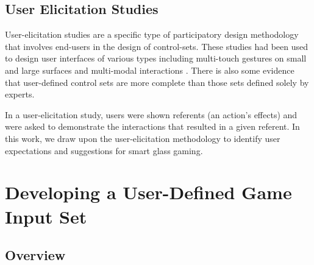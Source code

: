 \documentclass{sigchi}
\begin{document}
    \subsection{User Elicitation Studies}
    User-elicitation studies are a specific type of participatory design methodology that involves end-users in the design of control-sets\cite{Good:1984:BUI:358274.358284,Morris:2012:WWI:2396636.2396651}. These studies had been used to design user interfaces of various types including multi-touch gestures on small and large surfaces\cite{Anthony:2012:IRC:2396636.2396671,Epps:2006:SHS:1125451.1125601,Wobbrock:2009:UGS:1518701.1518866,Findlater:2012:BQA:2207676.2208660} and multi-modal interactions \cite{Morris:2012:WWI:2396636.2396651,Valdes:2014:EDS:2611222.2557373}. There is also some evidence that user-defined control sets are more complete than those sets defined solely by experts\cite{Anthony:2012:IRC:2396636.2396671,Pyryeskin:2012:CEG:2396636.2396638,Wobbrock:2009:UGS:1518701.1518866}.

    In a user-elicitation study, users were shown referents (an action's effects) and were asked to demonstrate the interactions that resulted in a given referent\cite{Wobbrock:2009:UGS:1518701.1518866}. In this work, we draw upon the user-elicitation methodology to identify user expectations and suggestions for smart glass gaming.

\section{Developing a User-Defined Game Input Set}


    \subsection {Overview}

\end{document}
